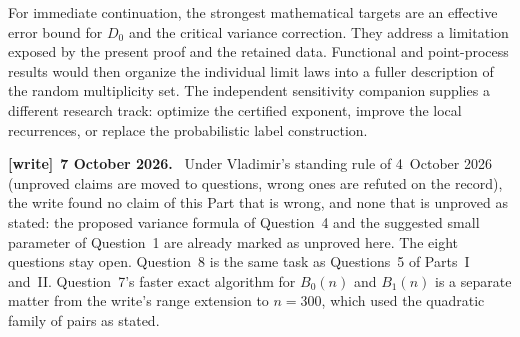 \documentclass[11pt,letterpaper]{article}
\numberwithin{equation}{section}
\theoremstyle{definition}\newtheorem{definition}[theorem]{Definition}
\theoremstyle{remark}\newtheorem{remark}[theorem]{Remark}
\newenvironment{writenote}[1][]{\par\smallskip\begingroup\small
 \noindent\textbf{[write]}\if\relax\detokenize{#1}\relax\else~\textbf{#1.}\fi\ }%
 {\par\endgroup\smallskip}
\begin{document}
For immediate continuation, the strongest mathematical targets are an
effective error bound for $D_0$ and the critical variance correction.
They address a limitation exposed by the present proof and the retained
data. Functional and point-process results would then organize the
individual limit laws into a fuller description of the random
multiplicity set. The independent sensitivity companion supplies a
different research track: optimize the certified exponent, improve the
local recurrences, or replace the probabilistic label construction.
\begin{writenote}[7 October 2026]
Under Vladimir's standing rule of 4~October 2026 (unproved claims are moved
to questions, wrong ones are refuted on the record), the write found no
claim of this Part that is wrong, and none that is unproved as stated: the
proposed variance formula of Question~4 and the suggested small parameter
of Question~1 are already marked as unproved here. The eight questions stay
open. Question~8 is the same task as Questions~5 of Parts~I and~II.
Question~7's faster exact algorithm for $B_0(n)$ and $B_1(n)$ is a
separate matter from the write's range extension to $n=300$, which used the
quadratic family of pairs as stated.
\end{writenote}

\clearpage
\end{document}

